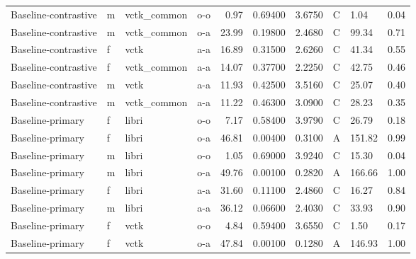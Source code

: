 \begin{tabular}{llllrrrlll}
 Baseline-contrastive &      m &  vctk\_common &  o-o &           0.97 &                 0.69400 &            3.6750 &              C &    1.04 &     0.04 \\
 Baseline-contrastive &      m &  vctk\_common &  o-a &          23.99 &                 0.19800 &            2.4680 &              C &   99.34 &     0.71 \\
 Baseline-contrastive &      f &         vctk &  a-a &          16.89 &                 0.31500 &            2.6260 &              C &   41.34 &     0.55 \\
 Baseline-contrastive &      f &  vctk\_common &  a-a &          14.07 &                 0.37700 &            2.2250 &              C &   42.75 &     0.46 \\
 Baseline-contrastive &      m &         vctk &  a-a &          11.93 &                 0.42500 &            3.5160 &              C &   25.07 &     0.40 \\
 Baseline-contrastive &      m &  vctk\_common &  a-a &          11.22 &                 0.46300 &            3.0900 &              C &   28.23 &     0.35 \\
     Baseline-primary &      f &        libri &  o-o &           7.17 &                 0.58400 &            3.9790 &              C &   26.79 &     0.18 \\
     Baseline-primary &      f &        libri &  o-a &          46.81 &                 0.00400 &            0.3100 &              A &  151.82 &     0.99 \\
     Baseline-primary &      m &        libri &  o-o &           1.05 &                 0.69000 &            3.9240 &              C &   15.30 &     0.04 \\
     Baseline-primary &      m &        libri &  o-a &          49.76 &                 0.00100 &            0.2820 &              A &  166.66 &     1.00 \\
     Baseline-primary &      f &        libri &  a-a &          31.60 &                 0.11100 &            2.4860 &              C &   16.27 &     0.84 \\
     Baseline-primary &      m &        libri &  a-a &          36.12 &                 0.06600 &            2.4030 &              C &   33.93 &     0.90 \\
     Baseline-primary &      f &         vctk &  o-o &           4.84 &                 0.59400 &            3.6550 &              C &    1.50 &     0.17 \\
     Baseline-primary &      f &         vctk &  o-a &          47.84 &                 0.00100 &            0.1280 &              A &  146.93 &     1.00 \\

\end{tabular}
